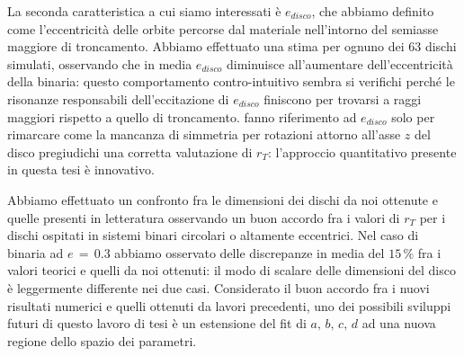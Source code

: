 \documentclass[12pt, a4paper]{report}
\begin{document}
La seconda caratteristica a cui siamo interessati è $e_{disco}$, che abbiamo definito come l'eccentricità delle orbite percorse dal materiale nell'intorno del semiasse maggiore di troncamento.
Abbiamo effettuato una stima per ognuno dei 63 dischi simulati, osservando che in media $e_{disco}$ diminuisce all'aumentare dell'eccentricità della binaria: questo comportamento contro-intuitivo sembra si verifichi perché le risonanze responsabili dell'eccitazione di $e_{disco}$ finiscono per trovarsi a raggi maggiori rispetto a quello di troncamento.
\textcite{ArtymowiczLubow1994} fanno riferimento ad $e_{disco}$ solo per rimarcare come la mancanza di simmetria per rotazioni attorno all'asse $z$ del disco pregiudichi una corretta valutazione di $r_T$: l'approccio quantitativo presente in questa tesi è innovativo.

Abbiamo effettuato un confronto fra le dimensioni dei dischi da noi ottenute e quelle presenti in letteratura osservando un buon accordo fra i valori di $r_T$ per i dischi ospitati in sistemi binari circolari o altamente eccentrici. 
Nel caso di binaria ad $e\,=\,0.3$ abbiamo osservato delle discrepanze in media del $15\,\%$ fra i valori teorici e quelli da noi ottenuti: il modo di scalare delle dimensioni del disco è leggermente differente nei due casi.
Considerato il buon accordo fra i nuovi risultati numerici e quelli ottenuti da lavori precedenti, uno dei possibili sviluppi futuri di questo lavoro di tesi è un estensione del fit di $a,\,b,\,c,\,d$ ad una nuova regione dello spazio dei parametri.

\setlength{\bibitemsep}{\baselineskip}
\printbibliography[heading = bibintoc, title=Bibliografia]
\end{document}
